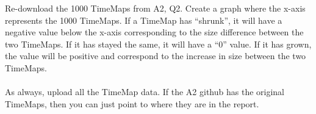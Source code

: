 Re-download the 1000 TimeMaps from A2, Q2.  Create a graph where
the x-axis represents the 1000 TimeMaps.  If a TimeMap has \enquote{shrunk},
it will have a negative value below the x-axis corresponding to the
size difference between the two TimeMaps.  If it has stayed the
same, it will have a \enquote{0} value.  If it has grown, the value will be 
positive and correspond to the increase in size between the two
TimeMaps.\\
\\
As always, upload all the TimeMap data.  If the A2 github has the 
original TimeMaps, then you can just point to where they are in 
the report.